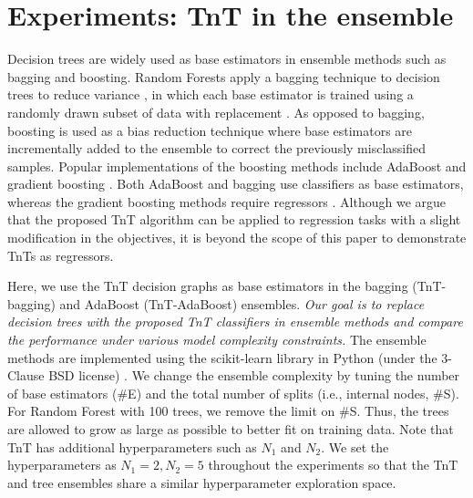 \documentclass{article}
\begin{document}
\section{Experiments: TnT in the ensemble}\vspace{-0mm}
Decision trees are widely used as base estimators in ensemble methods such as bagging and boosting. Random Forests apply a bagging technique to decision trees to reduce variance \cite{breiman2001random}, in which each base estimator is trained using a randomly drawn subset of data  with replacement \cite{breiman1996bagging}. As opposed to bagging, boosting is used as a bias reduction technique where base estimators are incrementally added to the ensemble to correct the previously misclassified samples. Popular implementations of the boosting methods include AdaBoost \cite{freund1997decision} and gradient boosting \cite{chen2016xgboost,ke2017lightgbm}. Both AdaBoost and bagging use classifiers as base estimators, whereas the gradient boosting methods require regressors \cite{chen2016xgboost, ke2017lightgbm}. Although we argue that the proposed TnT algorithm can be applied to regression tasks with a slight modification in the objectives, it is beyond the scope of this paper to demonstrate TnTs as regressors.

Here, we use the TnT decision graphs as base estimators in the bagging (TnT-bagging) and AdaBoost (TnT-AdaBoost) ensembles. \textit{Our goal is to replace decision trees with the proposed TnT classifiers in ensemble methods and compare the performance under various model complexity constraints.} The ensemble methods are implemented using the scikit-learn library in Python (under the 3-Clause BSD license) \cite{scikit-learn}. We change the ensemble complexity by tuning the number of base estimators ($\#$E) and the total number of splits (i.e., internal nodes, $\#$S). 
For Random Forest  with 100 trees, we remove the limit on $\#$S. Thus, the trees are allowed to grow as large as possible to better fit on training data. 
Note that  TnT  has additional hyperparameters such as $N_1$ and $N_2$. We set the hyperparameters as $N_1=2, N_2=5$ throughout the experiments so that the TnT and tree ensembles share a similar hyperparameter exploration space. 
\end{document}
